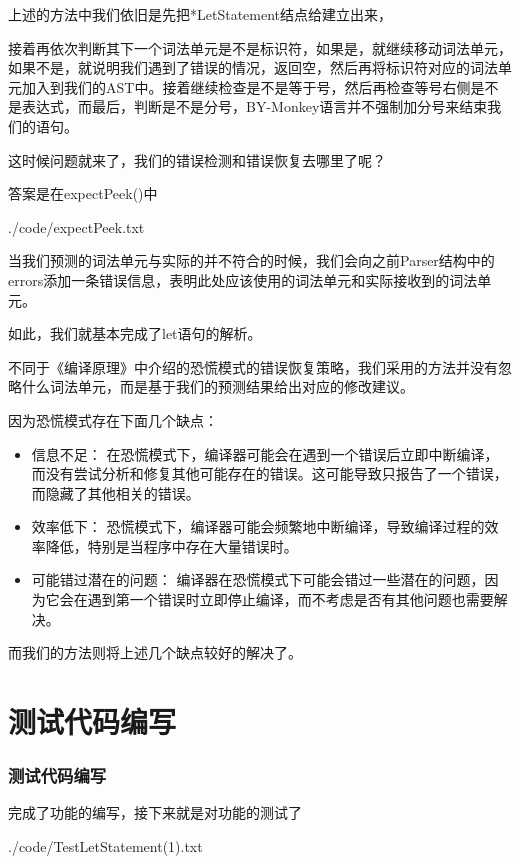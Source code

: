 \documentclass{beamer}
\begin{document}
	\begin{frame}
		上述的方法中我们依旧是先把*LetStatement结点给建立出来，
		
		接着再依次判断其下一个词法单元是不是标识符，如果是，就继续移动词法单元，如果不是，就说明我们遇到了错误的情况，返回空，然后再将标识符对应的词法单元加入到我们的AST中。接着继续检查是不是等于号，然后再检查等号右侧是不是表达式，而最后，判断是不是分号，BY-Monkey语言并不强制加分号来结束我们的语句。
		
		这时候问题就来了，我们的错误检测和错误恢复去哪里了呢？
		
		答案是在expectPeek()中
		
	\end{frame}
	\begin{frame}
		
		{./code/expectPeek.txt}
		
		当我们预测的词法单元与实际的并不符合的时候，我们会向之前Parser结构中的errors添加一条错误信息，表明此处应该使用的词法单元和实际接收到的词法单元。
		
		如此，我们就基本完成了let语句的解析。
	\end{frame}
	\begin{frame}
		不同于《编译原理》中介绍的恐慌模式的错误恢复策略，我们采用的方法并没有忽略什么词法单元，而是基于我们的预测结果给出对应的修改建议。
		
		因为恐慌模式存在下面几个缺点：
		
		\begin{itemize}
			\item 信息不足： 在恐慌模式下，编译器可能会在遇到一个错误后立即中断编译，而没有尝试分析和修复其他可能存在的错误。这可能导致只报告了一个错误，而隐藏了其他相关的错误。
			
			\item 效率低下： 恐慌模式下，编译器可能会频繁地中断编译，导致编译过程的效率降低，特别是当程序中存在大量错误时。
			
			\item 可能错过潜在的问题： 编译器在恐慌模式下可能会错过一些潜在的问题，因为它会在遇到第一个错误时立即停止编译，而不考虑是否有其他问题也需要解决。
		\end{itemize}
	
		而我们的方法则将上述几个缺点较好的解决了。
	\end{frame}
	\section{测试代码编写}
	\begin{frame}
		\frametitle{测试代码编写}
		完成了功能的编写，接下来就是对功能的测试了
		
		
		{./code/TestLetStatement(1).txt}
	\end{frame}
	
\end{document}
